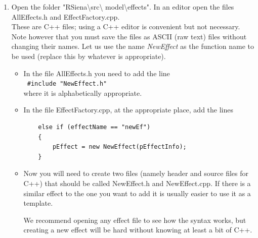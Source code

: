\documentclass[a4paper,fleqn,11pt]{article}
\newcommand{\+}{\, + \,}
\begin{document}
{\begin{enumerate}
\begin{itemize}
              For how to deal with internal effect parameters, look up
              a function defining an effect that has such
              a parameter.

		\item Build the package and install it.  Check from R that
              the new effect (which has only been created nominally)
              appears now in the effects object in RSiena.
		\end{itemize}
\item Open the folder
      \textsf{"RSiena\textbackslash src\textbackslash
         model\textbackslash effects"}.
         In an editor open the files \textsf{AllEffects.h}
         and  \textsf{EffectFactory.cpp}.\\
         These are C++ files; using a C++ editor is convenient
         but not necessary. Note however that you must save the files
         as ASCII (raw text) files without changing their names.
        Let us use the name \textit{NewEffect} as the function name
        to be used (replace this by whatever is appropriate).
		\begin{itemize}
			\item In the file AllEffects.h you need to add the line\\
                \texttt{ \#include "NewEffect.h" }\\
                 where it is alphabetically appropriate.
            \item In the file \textsf{EffectFactory.cpp}, at the appropriate place,
                  add the lines
                \begin{verbatim}
    else if (effectName == "newEf")
	{
		pEffect = new NewEffect(pEffectInfo);
	}
                \end{verbatim}
			\item Now you will need to create two files (namely header
                  and source files for
                   C++) that should be called \textsf{NewEffect.h} and
                   \textsf{NewEffect.cpp}.
                   If there is a similar effect to the one you want to add
                   it is usually easier to use it as a template.

                  We recommend opening any effect file to see
                  how the syntax works, but creating a new effect will be hard
                   without knowing at least a bit of C++.

		\end{itemize}


\end{enumerate}}
\end{document}
